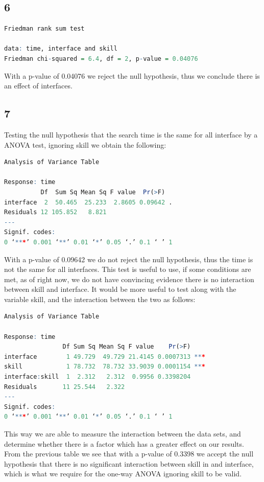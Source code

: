 \documentclass{article}
\begin{document}
    \subsection*{6}
	\begin{lstlisting}[language=R]
Friedman rank sum test

data: time, interface and skill
Friedman chi-squared = 6.4, df = 2, p-value = 0.04076
	\end{lstlisting}
	With a p-value of 0.04076 we reject the null hypothesis, thus we conclude there is an effect of interfaces.
    \subsection*{7}
    Testing the null hypothesis that the search time is the same for all interface by a ANOVA test, ignoring skill we obtain the following:
    \begin{lstlisting}[language=R]
    Analysis of Variance Table

Response: time
          Df  Sum Sq Mean Sq F value  Pr(>F)  
interface  2  50.465  25.233  2.8605 0.09642 .
Residuals 12 105.852   8.821                  
---
Signif. codes:  
0 ‘***’ 0.001 ‘**’ 0.01 ‘*’ 0.05 ‘.’ 0.1 ‘ ’ 1
	\end{lstlisting}
	With a p-value of 0.09642 we do not reject the null hypothesis, thus the time is not the same for all interfaces.
	This test is useful to use, if some conditions are met, as of right now, we do not have convincing evidence there is no interaction between skill and interface. It would be more useful to test along with the variable skill, and the interaction between the two as follows:
	    \begin{lstlisting}[language=R]
	Analysis of Variance Table

Response: time
                Df Sum Sq Mean Sq F value    Pr(>F)    
interface        1 49.729  49.729 21.4145 0.0007313 ***
skill            1 78.732  78.732 33.9039 0.0001154 ***
interface:skill  1  2.312   2.312  0.9956 0.3398204    
Residuals       11 25.544   2.322                      
---
Signif. codes:  
0 ‘***’ 0.001 ‘**’ 0.01 ‘*’ 0.05 ‘.’ 0.1 ‘ ’ 1
	\end{lstlisting}
	This way we are able to measure the interaction between the data sets, and determine whether there is a factor which has a greater effect on our results. From the previous table we see that with a p-value of 0.3398 we accept the null hypothesis that there is no significant interaction between skill in and interface, which is what we require for the one-way ANOVA ignoring skill to be valid.
\end{document}
